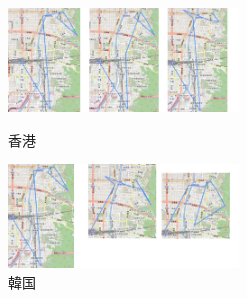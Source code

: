 \documentclass[a4paper,12pt]{jsreport}
\theoremstyle{definition}
\begin{document}
\begin{figure}[htbp]
    \begin{minipage}{0.49\hsize}
        \begin{center}
            \includegraphics[width=61mm]{png/honkon.png}
        \end{center}
        \caption{香港}
        \label{fig:honkon}
    \end{minipage}
    \begin{minipage}{0.49\hsize}
        \begin{center}
            \includegraphics[width=61mm]{png/korea.png}
        \end{center}
        \caption{韓国}
        \label{fig:korea}
    \end{minipage}
\end{figure}
\end{document}
